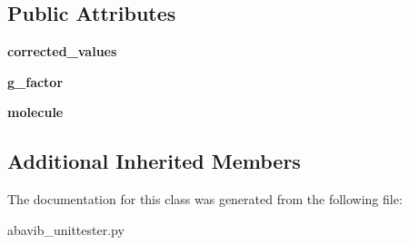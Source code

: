 \subsection*{Public Attributes}
\begin{DoxyCompactItemize}
\item 
\hypertarget{classabavib__unittester_1_1g__factor__test_a890e6cdd38d247f49adb596a69af14e6}{{\bfseries corrected\+\_\+values}}\label{classabavib__unittester_1_1g__factor__test_a890e6cdd38d247f49adb596a69af14e6}

\item 
\hypertarget{classabavib__unittester_1_1g__factor__test_af85acd64376d0d28fe878aaa8f0d2cfa}{{\bfseries g\+\_\+factor}}\label{classabavib__unittester_1_1g__factor__test_af85acd64376d0d28fe878aaa8f0d2cfa}

\item 
\hypertarget{classabavib__unittester_1_1g__factor__test_a9d68d9437ecb32350670facd5779437c}{{\bfseries molecule}}\label{classabavib__unittester_1_1g__factor__test_a9d68d9437ecb32350670facd5779437c}

\end{DoxyCompactItemize}
\subsection*{Additional Inherited Members}


The documentation for this class was generated from the following file\+:\begin{DoxyCompactItemize}
\item 
abavib\+\_\+unittester.\+py\end{DoxyCompactItemize}
